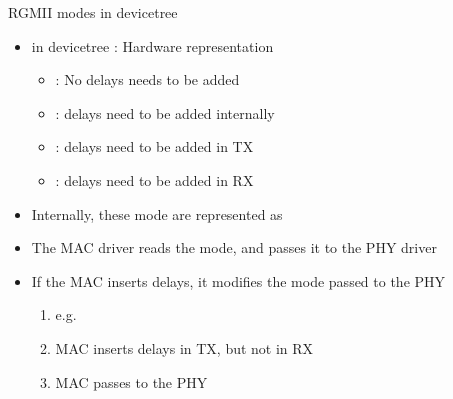 \begin{frame}{RGMII modes in devicetree}
	\begin{itemize}
			\item {} in devicetree : Hardware representation
				\begin{itemize}
					\item \textbf{} : No delays needs to be added
					\item \textbf{} : delays need to be added internally
					\item \textbf{} : delays need to be added in TX
					\item \textbf{} : delays need to be added in RX
				\end{itemize}
			\item Internally, these mode are represented as 
			\item The MAC driver reads the mode, and passes it to the PHY driver
			\item If the MAC inserts delays, it modifies the mode passed to the PHY
				\begin{enumerate}
					\item e.g. 
					\item MAC inserts delays in TX, but not in RX
					\item MAC passes  to the PHY
				\end{enumerate}

		\end{itemize}
\end{frame}


